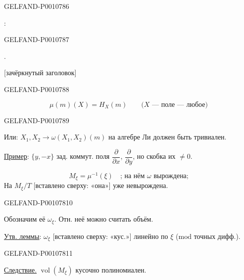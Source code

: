 \begin{GelfandAdjacentEvidence}{GELFAND-P001078}{6}


: 
\end{GelfandAdjacentEvidence}
\begin{GelfandAdjacentEvidence}{GELFAND-P001078}{7}

.

[зачёркнутый заголовок]
\end{GelfandAdjacentEvidence}
\begin{GelfandAdjacentEvidence}{GELFAND-P001078}{8}

\begin{equation*}
\mu(m)(X)=H_X(m)\qquad\text{($X$ — поле — любое)}
\tag{1}
\end{equation*}
\end{GelfandAdjacentEvidence}
\begin{GelfandAdjacentEvidence}{GELFAND-P001078}{9}


Или:  $X_1,X_2\longrightarrow\omega(X_1,X_2)(m)$
на алгебре Ли должен быть тривиален.

\uline{Пример}: $\{y,-x\}$ зад. коммут. поля
$\dfrac{\partial}{\partial x}$, $\dfrac{\partial}{\partial y}$,
но скобка их $\ne0$.

\begin{equation*}
M_\xi=\mu^{-1}(\xi)\quad\text{; на нём \(\omega\) вырождена;}
\tag{2}
\end{equation*}
На $M_\xi/T$ [вставлено сверху: «она»] уже невырождена.
\end{GelfandAdjacentEvidence}
\begin{GelfandAdjacentEvidence}{GELFAND-P001078}{10}

Обозначим её $\omega_\xi$. Отн. неё можно считать объём.

\uline{Утв. леммы}: $\omega_\xi$ [вставлено сверху: «кус.»] линейно по $\xi$ ($\mathrm{mod}$ точных дифф.).
\end{GelfandAdjacentEvidence}
\begin{GelfandAdjacentEvidence}{GELFAND-P001078}{11}


\uline{Следствие.} $\operatorname{vol}(M_\xi)$ кусочно полиномиален.
\end{GelfandAdjacentEvidence}
